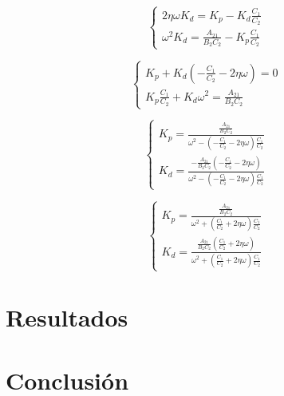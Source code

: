 \documentclass{article}
\begin{document}
                \begin{equation}
                    \begin{cases}
                        2 \eta \omega K_d=  K_p - K_d \frac{C_1 }{C_2} \\
                        \omega^2 K_d = \frac{A_{21}}{B_{2} C_2} - K_p \frac{C_1}{C_2}
                    \end{cases}
                \end{equation}

                \begin{equation}
                    \begin{cases}
                        K_p + K_d (-\frac{C_1}{C_2} - 2 \eta \omega) = 0 \\
                        K_p \frac{C_1}{C_2} + K_d \omega^2 = \frac{A_{21}}{B_{2} C_2} 
                    \end{cases}
                \end{equation}

                \begin{equation}
                    \begin{cases}
                        K_p = \frac{\frac{A_{21}}{B_{2} C_2}}{\omega^2-(-\frac{C_1}{C_2} - 2 \eta \omega)\frac{C_1}{C_2}} \\
                        K_d = \frac{-\frac{A_{21}}{B_{2} C_2} (-\frac{C_1}{C_2} - 2 \eta \omega)}{\omega^2-(-\frac{C_1}{C_2} - 2 \eta \omega)\frac{C_1}{C_2}}
                    \end{cases}
                \end{equation}

                \begin{equation}
                    \begin{cases}
                        K_p = \frac{\frac{A_{21}}{B_{2} C_2}}{\omega^2+(\frac{C_1}{C_2} + 2 \eta \omega)\frac{C_1}{C_2}} \\
                        K_d = \frac{\frac{A_{21}}{B_{2} C_2} (\frac{C_1}{C_2} + 2 \eta \omega)}{\omega^2+(\frac{C_1}{C_2} + 2 \eta \omega)\frac{C_1}{C_2}}
                    \end{cases}
                \end{equation}













            
                



            



\section{Resultados} \label{sec:results}

\section{Conclusión} \label{sec:conclusion}


%

%
\end{document}
